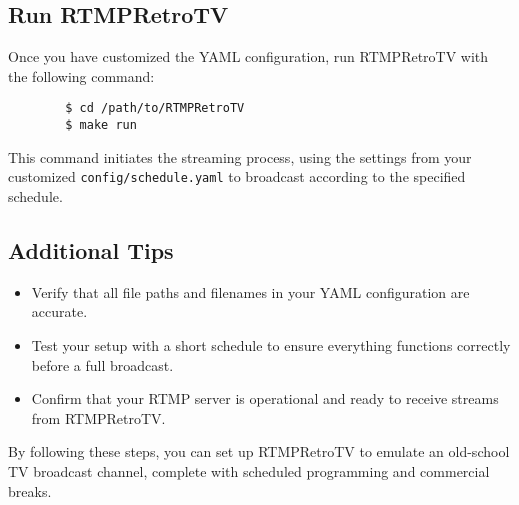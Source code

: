 \documentclass{article}
\begin{document}
	\subsection{Run RTMPRetroTV}
	
	Once you have customized the YAML configuration, run RTMPRetroTV with the following command:
	
	\begin{verbatim}
		$ cd /path/to/RTMPRetroTV
		$ make run
	\end{verbatim}
	
	This command initiates the streaming process, using the settings from your customized \texttt{config/schedule.yaml} to broadcast according to the specified schedule.
	
	\subsection{Additional Tips}
	
	\begin{itemize}
		\item Verify that all file paths and filenames in your YAML configuration are accurate.
		\item Test your setup with a short schedule to ensure everything functions correctly before a full broadcast.
		\item Confirm that your RTMP server is operational and ready to receive streams from RTMPRetroTV.
	\end{itemize}
	
	By following these steps, you can set up RTMPRetroTV to emulate an old-school TV broadcast channel, complete with scheduled programming and commercial breaks.
	
\end{document}
